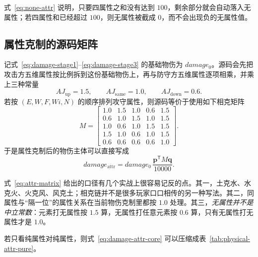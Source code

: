 式~\eqref{eq:none-attr} 说明，只要四属性之和没有达到 $100$，剩余部分就会自动落入无属性；若四属性和已经超过 $100$，则无属性被截成 $0$，而不会出现负的无属性值。

\subsection{属性克制的源码矩阵}

记式~\eqref{eq:damage-stage1}--\eqref{eq:damage-stage3} 的基础物伤为 $damage_0$。源码会先把攻击方五维属性按比例拆到这份基础物伤上，再与防守方五维属性逐项相乘，并乘上三种常量
\begin{equation}
    AJ_{\mathrm{up}}=1.5,
    \qquad
    AJ_{\mathrm{same}}=1.0,
    \qquad
    AJ_{\mathrm{down}}=0.6.
\end{equation}
若按 $(E,W,F,Wi,N)$ 的顺序排列攻守属性，则源码等价于使用如下相克矩阵
\begin{equation}
    M=
    \begin{bmatrix}
        1.0 & 1.5 & 1.0 & 0.6 & 1.5 \\
        0.6 & 1.0 & 1.5 & 1.0 & 1.5 \\
        1.0 & 0.6 & 1.0 & 1.5 & 1.5 \\
        1.5 & 1.0 & 0.6 & 1.0 & 1.5 \\
        0.6 & 0.6 & 0.6 & 0.6 & 1.0
    \end{bmatrix}.
    \label{eq:attr-matrix}
\end{equation}
于是属性克制后的物伤主体可以直接写成
\begin{equation}
    damage_{\mathrm{attr}}
    = damage_0\,\frac{\bm{p}^{\mathsf T}M\bm{q}}{10000}.
    \label{eq:damage-attr-core}
\end{equation}

式~\eqref{eq:attr-matrix} 给出的口径有几个实战上很容易记反的点。其一，土克水、水克火、火克风、风克土；相克链并不是很多玩家口口相传的另一种写法。其二，同属性与“隔一位”的属性关系在当前物伤克制里都按 $1.0$ 处理。其三，\emph{无属性并不是中立常数}：元素打无属性按 $1.5$ 算，无属性打任意元素按 $0.6$ 算，只有无属性打无属性才是 $1.0$。

若只看纯属性对纯属性，则式~\eqref{eq:damage-attr-core} 可以压缩成表~\ref{tab:physical-attr-pure}。

